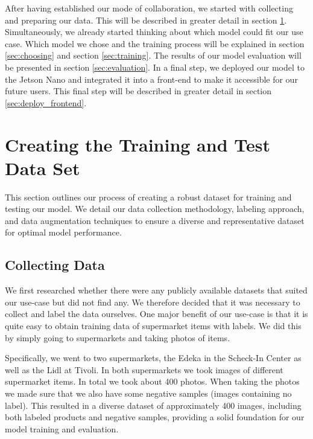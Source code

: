 After having established our mode of collaboration, we started with collecting and preparing our data. This will be described in greater detail in section \ref{sec:data_split}. Simultaneously, we already started thinking about which model could fit our use case. Which model we chose and the training process will be explained in section \ref{sec:choosing} and section \ref{sec:training}. The results of our model evaluation will be presented in section \ref{sec:evaluation}. In a final step, we deployed our model to the Jetson Nano and integrated it into a front-end to make it accessible for our future users. This final step will be described in greater detail in section \ref{sec:deploy_frontend}.

\newpage
\section{Creating the Training and Test Data Set}
\label{sec:data_split}
This section outlines our process of creating a robust dataset for training and testing our model. We detail our data collection methodology, labeling approach, and data augmentation techniques to ensure a diverse and representative dataset for optimal model performance.
\subsection{Collecting Data}
\label{subsec:collecting_data}
We first researched whether there were any publicly available datasets that suited our use-case but did not find any. We therefore decided that it was necessary to collect and label the data ourselves. One major benefit of our use-case is that it is quite easy to obtain training data of supermarket items with labels. We did this by simply going to supermarkets and taking photos of items. 

Specifically, we went to two supermarkets, the Edeka in the Scheck-In Center as well as the Lidl at Tivoli. In both supermarkets we took images of different supermarket items. In total we took about 400 photos. When taking the photos we made sure that we also have some negative samples (images containing no label). This resulted in a diverse dataset of approximately 400 images, including both labeled products and negative samples, providing a solid foundation for our model training and evaluation.

